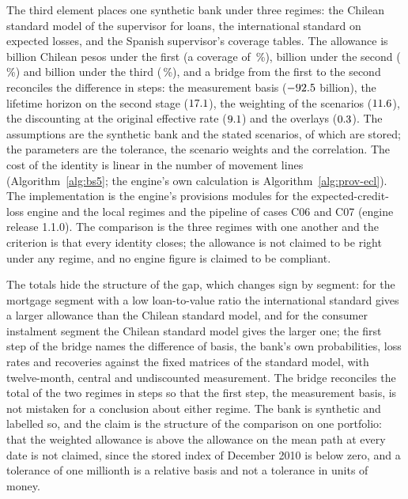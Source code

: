 The third element places one synthetic bank under three regimes: the Chilean standard model of the supervisor for loans, the international
standard on expected losses, and the Spanish supervisor's coverage tables. The allowance is \pxFiveCmf{} billion Chilean pesos under the
first (a coverage of \pxFiveCmfCov{}\,\%), \pxFiveIfrs{} billion under the second (\pxFiveIfrsCov{}\,\%) and \pxFiveBde{} billion under the third (\pxFiveBdeCov{}\,\%), and a bridge
from the first to the second reconciles the difference in steps: the measurement basis ($-92.5$ billion), the lifetime horizon on the second stage
($17.1$), the weighting of the scenarios ($11.6$), the discounting at the original effective rate ($9.1$) and the overlays
($0.3$). The assumptions are the synthetic bank and the stated scenarios, \pxFiveScenarios{} of which are stored; the
parameters are the tolerance, the scenario weights and the correlation. The cost of the identity is linear in the number of movement lines (Algorithm~\ref{alg:bs5}; the engine's own calculation is Algorithm~\ref{alg:prov-ecl}). The
implementation is the engine's provisions modules for the expected-credit-loss engine and the local regimes and the pipeline of cases C06 and C07
(engine release 1.1.0). The comparison is the three regimes with one another and the criterion is that every identity closes; the allowance is not claimed
to be right under any regime, and no engine figure is claimed to be compliant.

The totals hide the structure of the gap, which changes sign by segment: for the mortgage segment with a low loan-to-value ratio the international standard gives a larger allowance than the Chilean standard model, and for the consumer instalment
segment the Chilean standard model gives the larger one; the first step of the bridge names the difference of basis, the bank's own probabilities, loss rates and recoveries against the fixed matrices of the standard model, with twelve-month, central and undiscounted measurement. The bridge reconciles the total of the two regimes in steps so that the first step, the measurement basis, is not mistaken for a conclusion about either regime. The
bank is synthetic and labelled so, and the claim is the structure of the comparison on one portfolio: that the weighted allowance is above the allowance on the mean path at every date is not claimed, since the stored index of December 2010 is below
zero, and a tolerance of one millionth is a relative basis and not a tolerance in units of money.

